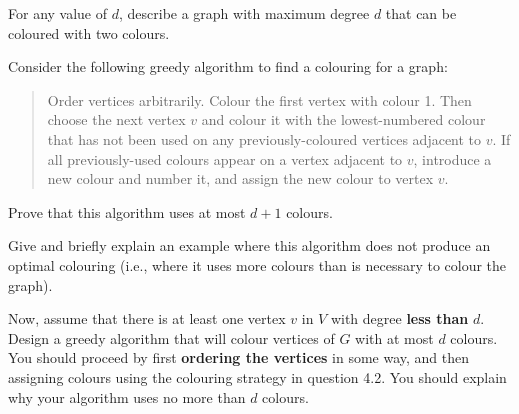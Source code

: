 \begin{questions}

\question[2] For any value of $d$, describe a graph with maximum degree $d$ that can be coloured with two colours.

\ifsolutions\fi 

\question[2] Consider the following greedy algorithm to find a colouring for a graph:

\begin{quote}
    Order vertices arbitrarily. Colour the first vertex with colour 1. Then choose the next vertex $v$ and colour it with the lowest-numbered colour that has not been used on any previously-coloured vertices adjacent to $v$. If all previously-used colours appear on a vertex adjacent to $v$, introduce a new colour and number it, and assign the new colour to vertex $v$.
\end{quote}

Prove that this algorithm uses at most $d+1$ colours.

\ifsolutions\fi 

\question[2] Give and briefly explain an example where this algorithm does not produce an optimal colouring (i.e., where it uses more colours than is necessary to colour the graph).

\ifsolutions\fi 

\question[5] Now, assume that there is at least one vertex $v$ in $V$ with degree \textbf{less than} $d$.  Design a greedy algorithm that will colour vertices of $G$ with at most $d$ colours. You should proceed by first \textbf{ordering the vertices} in some way, and then assigning colours using the colouring strategy in question 4.2. You should explain why your algorithm uses no more than $d$ colours.

\ifsolutions\fi 

\end{questions}